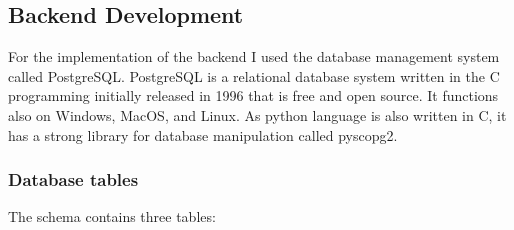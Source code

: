     \subsection{Backend Development}
        For the implementation of the backend I used the database management system called PostgreSQL. PostgreSQL is a relational database system written in the C programming initially released in 1996 that is free and open source. It functions also on Windows, MacOS, and Linux. As python language is also written in C, it has a strong library for database manipulation called pyscopg2.\\
        \subsubsection{Database tables}
            The schema contains three tables:
